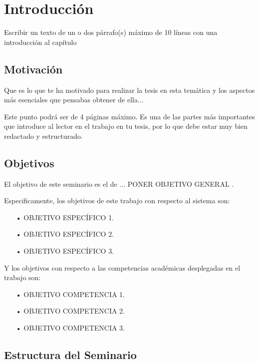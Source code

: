 \chapter{Introducción}
Escribir un texto de un o dos párrafo(s) máximo de 10 líneas con una introducción al capítulo


\section{Motivación}
Que es lo que te ha motivado para realizar la tesis en esta temática y los aspectos más esenciales que pensabas obtener de ella...

Este punto podrá ser de 4 páginas máximo. Es una de las partes más importantes que introduce al lector en el trabajo en tu tesis, por lo que debe estar muy bien redactado y estructurado.

\section{Objetivos}

El objetivo de este seminario es el de ... PONER OBJETIVO GENERAL .

Especificamente, los objetivos de este trabajo con respecto al sistema son:

\begin{itemize}
\item[•] OBJETIVO ESPECÍFICO 1.
\item[•] OBJETIVO ESPECÍFICO 2.
\item[•] OBJETIVO ESPECÍFICO 3.


\end{itemize}

Y los objetivos con respecto a las competencias académicas desplegadas en el trabajo son:
\begin{itemize}
\item[•] OBJETIVO COMPETENCIA 1.
\item[•] OBJETIVO COMPETENCIA 2.
\item[•] OBJETIVO COMPETENCIA 3.

\end{itemize}

\section{Estructura del Seminario}


